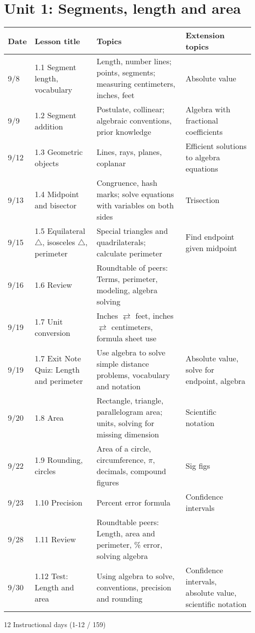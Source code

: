 \documentclass[12pt, twoside]{article}
\begin{document}
\section*{Unit 1: Segments, length and area}
\begin{tabular}{|p{0.9cm}|p{4cm}|p{7cm}|p{5cm}|}
  \hline
  Date & Lesson title & Topics  & Extension topics \\
  \hline
  9/8 & 1.1 Segment length, vocabulary & Length, number lines; points, segments; measuring centimeters, inches, feet & Absolute value \\
  \hline
  9/9 & 1.2 Segment addition & Postulate, collinear; algebraic conventions, prior knowledge & Algebra with fractional coefficients \\
  \hline
  9/12 & 1.3 Geometric objects & Lines, rays, planes, coplanar & Efficient solutions to algebra equations \\
  \hline
  9/13 & 1.4 Midpoint and bisector & Congruence, hash marks; solve equations with variables on both sides & Trisection \\
  \hline
  9/15 & 1.5 Equilateral $\triangle$, isosceles $\triangle$, perimeter & Special triangles and quadrilaterals; calculate perimeter & Find endpoint given midpoint \\
  \hline
  9/16 & 1.6 Review & Roundtable of peers: Terms, perimeter, modeling, algebra solving & \\
  \hline
  9/19 & 1.7 Unit conversion & Inches $\rightleftarrows$ feet, inches $\rightleftarrows$ centimeters, formula sheet use & \\
  \hline
  9/19 & 1.7 Exit Note Quiz: Length and perimeter & Use algebra to solve simple distance problems, vocabulary and notation & Absolute value, solve for endpoint, algebra \\
  \hline
  9/20 & 1.8 Area & Rectangle, triangle, parallelogram area; units, solving for missing dimension & Scientific notation \\
  \hline
  9/22 & 1.9 Rounding, circles & Area of a circle, circumference, $\pi$, decimals, compound figures & Sig figs \\
  \hline
  9/23 & 1.10 Precision & Percent error formula & Confidence intervals \\
  \hline
  9/28 & 1.11 Review & Roundtable peers: Length, area and perimeter, \% error, solving algebra & \\
  \hline
  9/30 & 1.12 Test: Length and area & Using algebra to solve, conventions, precision and rounding & Confidence intervals, absolute value, scientific notation \\
  \hline

\end{tabular} \par \vspace*{0.3cm}
12 Instructional days (1-12 / 159)
\end{document}
